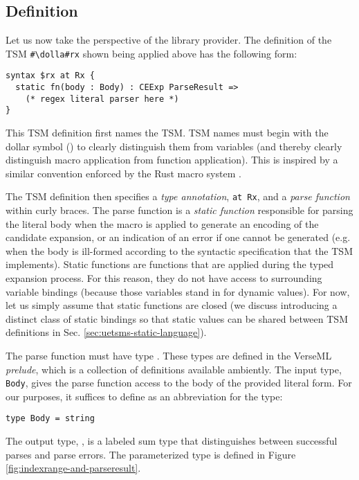 \subsection{Definition}\label{sec:uetsms-definition}
Let us now take the perspective of the library provider. The definition of the TSM \lstinline{#\dolla#rx} shown being applied above has the following form:
\begin{lstlisting}[numbers=none,mathescape=|]
syntax $rx at Rx {
  static fn(body : Body) : CEExp ParseResult => 
    (* regex literal parser here *)
}
\end{lstlisting}
This {TSM definition} first names the TSM. 
 TSM names must begin with the dollar symbol (\li{#\dolla#}) to clearly distinguish them from variables (and thereby clearly distinguish macro application from function application). This is inspired by a similar convention enforced by the Rust macro system \cite{Rust/Macros}.

The TSM definition then specifies a \emph{type annotation}, \lstinline{at Rx}, and a \emph{parse function} within curly braces. 
The {parse function} is a \emph{static function} responsible for parsing the literal body when the macro is applied to generate an encoding of the candidate expansion, or an indication of an error if one cannot be generated (e.g. when the body is ill-formed according to the syntactic specification that the TSM implements). Static functions are functions that are applied during the typed expansion process. For this reason, they do not have access to surrounding variable bindings (because those variables stand in for dynamic values). For now, let us simply assume that static functions are closed (we discuss introducing a distinct class of static bindings so that static values can be shared between TSM definitions in Sec. \ref{sec:uetsms-static-language}).

The parse function must have type . These types are defined in the VerseML \emph{prelude}, which is a collection of definitions available ambiently. The input type, \lstinline{Body}, gives the parse function access to the {body} of the provided literal form. For our purposes, it suffices to define  as an abbreviation for the  type:
\begin{lstlisting}[numbers=none]
type Body = string
\end{lstlisting} 

The output type, , is a labeled sum type that distinguishes between successful parses and parse errors. The parameterized type  is defined in Figure \ref{fig:indexrange-and-parseresult}.

